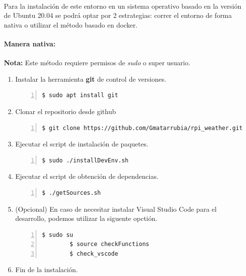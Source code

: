 \paragraph{}Para la instalación de este entorno en un sistema operativo basado en
la versión de Ubuntu 20.04 se podrá optar por 2 estrategias: correr el entorno de
forma nativa o utilizar el método basado en docker.

\paragraph{Manera nativa:}

\paragraph{}\textbf{Nota:} Este método requiere permisos de \emph{sudo} o super usuario.

\begin{enumerate}
    \item Instalar la herramienta \textbf{\gls{git}} de control de versiones.
    \begin{lstlisting}[style=consola, numbers=left]
        $ sudo apt install git
    \end{lstlisting}

    \item Clonar el repositorio desde github
    \begin{lstlisting}[style=consola, numbers=left]
        $ git clone https://github.com/Gmatarrubia/rpi_weather.git
    \end{lstlisting}

    \item Ejecutar el script de instalación de paquetes.
    \begin{lstlisting}[style=consola, numbers=left]
        $ sudo ./installDevEnv.sh
    \end{lstlisting}

    \item Ejecutar el script de obtención de dependencias.
    \begin{lstlisting}[style=consola, numbers=left]
        $ ./getSources.sh
    \end{lstlisting}

    \item (Opcional) En caso de necesitar instalar Visual Studio Code para el desarrollo,
    podemos utilizar la siguente opctión.
    \begin{lstlisting}[style=consola, numbers=left]
        $ sudo su
        $ source checkFunctions
        $ check_vscode
    \end{lstlisting}

    \item Fin de la instalación.
\end{enumerate}

